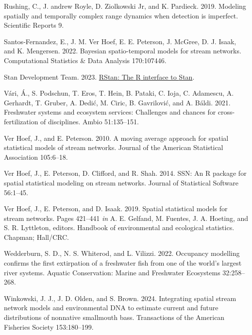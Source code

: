 \documentclass[
  11pt,
  a4paper,
]{article}
\newlength{\cslhangindent}
\newenvironment{CSLReferences}[2] %
 {\begin{list}{}{%
  \setlength{\itemindent}{0pt}
  \setlength{\leftmargin}{0pt}
  \setlength{\parsep}{0pt}
  \ifodd #1
   \setlength{\leftmargin}{\cslhangindent}
   \setlength{\itemindent}{-1\cslhangindent}
  \fi
  \setlength{\itemsep}{#2\baselineskip}}}
 {\end{list}}
\begin{document}
\begin{CSLReferences}{1}{0}
Rushing, C., J. andrew Royle, D. Ziolkowski Jr, and K. Pardieck. 2019. Modeling spatially and temporally complex range dynamics when detection is imperfect. Scientific Reports 9.

Santos-Fernandez, E., J. M. Ver Hoef, E. E. Peterson, J. McGree, D. J. Isaak, and K. Mengersen. 2022. Bayesian spatio-temporal models for stream networks. Computational Statistics \& Data Analysis 170:107446.

Stan Development Team. 2023. \href{https://mc-stan.org/}{{RStan}: The {R} interface to {Stan}}.

Vári, Á., S. Podschun, T. Eros, T. Hein, B. Pataki, C. Ioja, C. Adamescu, A. Gerhardt, T. Gruber, A. Dedić, M. Ciric, B. Gavrilović, and A. Báldi. 2021. Freshwater systems and ecosystem services: Challenges and chances for cross-fertilization of disciplines. Ambio 51:135--151.

Ver Hoef, J., and E. Peterson. 2010. A moving average approach for spatial statistical models of stream networks. Journal of the American Statistical Association 105:6--18.

Ver Hoef, J., E. Peterson, D. Clifford, and R. Shah. 2014. {SSN}: An {R} package for spatial statistical modeling on stream networks. Journal of Statistical Software 56:1--45.

Ver Hoef, J., E. Peterson, and D. Isaak. 2019. Spatial statistical models for stream networks. Pages 421--441 \emph{in} A. E. Gelfand, M. Fuentes, J. A. Hoeting, and S. R. Lyttleton, editors. Handbook of environmental and ecological statistics. Chapman; Hall/CRC.

Wedderburn, S. D., N. S. Whiterod, and L. Vilizzi. 2022. Occupancy modelling confirms the first extirpation of a freshwater fish from one of the world's largest river systems. Aquatic Conservation: Marine and Freshwater Ecosystems 32:258--268.

Winkowski, J. J., J. D. Olden, and S. Brown. 2024. Integrating spatial stream network models and environmental DNA to estimate current and future distributions of nonnative smallmouth bass. Transactions of the American Fisheries Society 153:180--199.

\end{CSLReferences}
\end{document}
